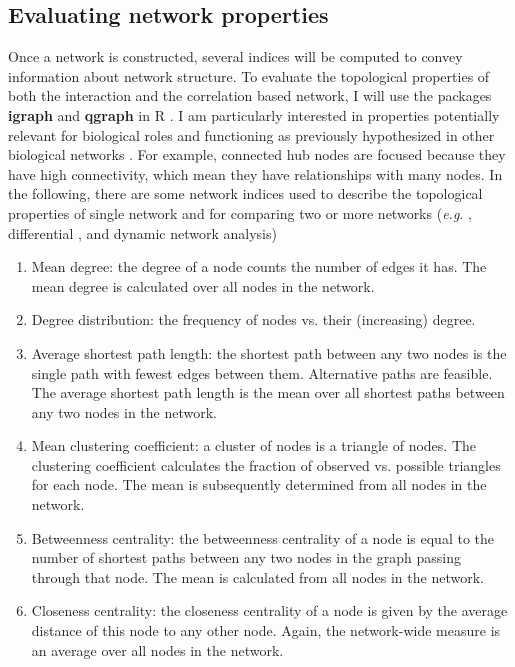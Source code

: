 \subsection*{Evaluating network properties}

Once a network is constructed, several indices will be computed to convey information about network structure. To evaluate the topological properties of both the interaction and the correlation based network, I will use the packages \textbf{igraph} and \textbf{qgraph} in \textsf{R} \citep{qgraph}. I am particularly interested in properties potentially relevant for biological roles and functioning as previously hypothesized in other biological networks \citep{Strogatz:2001wc, horvath2011weighted}. For example, connected hub nodes are focused because they have high connectivity, which mean they have relationships with many nodes. In the following, there are some network indices used to describe the topological properties of single network and for comparing two or more networks (\textit{e.g}. , differential , and dynamic network analysis) 

\begin{enumerate}
\item Mean degree: the degree of a node counts the number of edges it has. The mean degree is calculated over all nodes in the network.
\item Degree distribution: the frequency of nodes vs. their (increasing) degree.
\item Average shortest path length: the shortest path between any two nodes is the single path with fewest edges between them. Alternative paths are feasible. The average shortest path length is the mean over all shortest paths between any two nodes in the network.
\item Mean clustering coefficient: a cluster of nodes is a triangle of nodes. The clustering coefficient calculates the fraction of observed vs. possible triangles for each node. The mean is subsequently determined from all nodes in the network.
\item Betweenness centrality: the betweenness centrality of a node is equal to the number of shortest paths between any two nodes in the graph passing through that node. The mean is calculated from all nodes in the network.
\item Closeness centrality: the closeness centrality of a node is given by the average distance of this node to any other node. Again, the network-wide measure is an average over all nodes in the network.
\end{enumerate}

